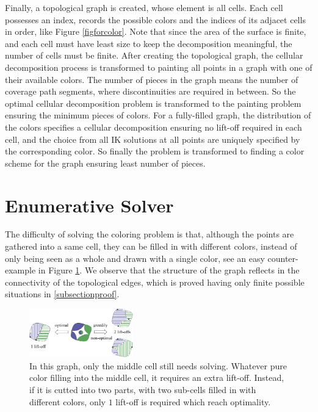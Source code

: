 \documentclass[journal]{IEEEtran}
\begin{document}
Finally, a topological graph is created, whose element is all cells. Each cell possesses an index, records the possible colors and the indices of its adjacet cells in order, like Figure \ref{figforcolor}. 
Note that since the area of the surface is finite, and each cell must have least size to keep the decomposition meaningful, the number of cells must be finite. 
After creating the topological graph, the cellular decomposition process is transformed to painting all points in a graph with one of their available colors.
The number of pieces in the graph means the number of coverage path segments, where discontinuities are required in between. So the optimal cellular decomposition problem is transformed to the painting problem ensuring the minimum pieces of colors. 
For a fully-filled graph, the distribution of the colors specifies a cellular decomposition ensuring no lift-off required in each cell, and the choice from all IK solutions at all points are uniquely specified by the corresponding color. So finally the problem is transformed to finding a color scheme for the graph ensuring least number of pieces.

\section{Enumerative Solver}\label{sectionenumerativesolver}
The difficulty of solving the coloring problem is that, although the points are gathered into a same cell, they can be filled in with different colors, 
instead of only being seen as a whole and drawn with a single color, see an easy counter-example in Figure \ref{figsimpleexample}. 
We observe that the structure of the graph reflects in the connectivity of the topological edges, which is proved having only finite possible situations in \ref{subsectionproof}. 


\begin{figure}[t]
\centering
\includegraphics[width = 0.4\textwidth]{simple_example/simple_3}
\caption{
In this graph, only the middle cell still needs solving. 
Whatever pure color filling into the middle cell, it requires an extra lift-off. Instead, if it is cutted into two parts, with two sub-cells filled in with different colors, only $1$ lift-off is required which reach optimality. 
}\label{figsimpleexample}
\end{figure}
\end{document}

